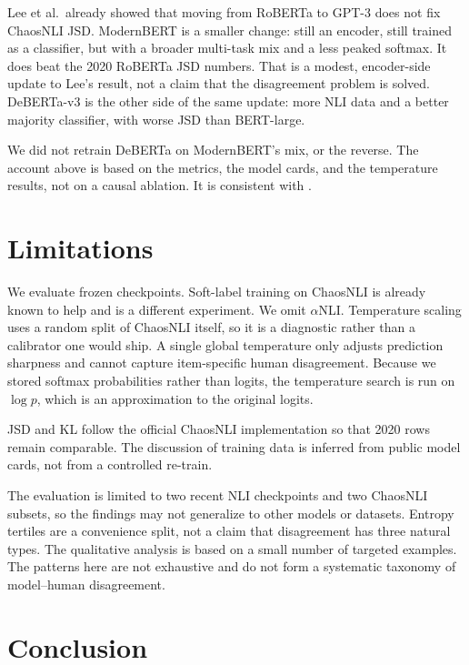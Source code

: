\documentclass[11pt,a4paper]{article}
\begin{document}
Lee et al.\ already showed that moving from RoBERTa to GPT-3 does not fix ChaosNLI JSD. ModernBERT is a smaller change: still an encoder, still trained as a classifier, but with a broader multi-task mix and a less peaked softmax. It does beat the 2020 RoBERTa JSD numbers. That is a modest, encoder-side update to Lee's result, not a claim that the disagreement problem is solved. DeBERTa-v3 is the other side of the same update: more NLI data and a better majority classifier, with worse JSD than BERT-large.

We did not retrain DeBERTa on ModernBERT's mix, or the reverse. The account above is based on the metrics, the model cards, and the temperature results, not on a causal ablation. It is consistent with \cite{nie2020chaosnli,meissner2021capturing,baan2022stop,pavlick2019inherent}.

\section{Limitations}

We evaluate frozen checkpoints. Soft-label training on ChaosNLI is already known to help \cite{zhou2022distributed} and is a different experiment. We omit $\alpha$NLI. Temperature scaling uses a random split of ChaosNLI itself, so it is a diagnostic rather than a calibrator one would ship. A single global temperature only adjusts prediction sharpness and cannot capture item-specific human disagreement. Because we stored softmax probabilities rather than logits, the temperature search is run on $\log p$, which is an approximation to the original logits.

JSD and KL follow the official ChaosNLI implementation so that 2020 rows remain comparable. The discussion of training data is inferred from public model cards, not from a controlled re-train.

The evaluation is limited to two recent NLI checkpoints and two ChaosNLI subsets, so the findings may not generalize to other models or datasets. Entropy tertiles are a convenience split, not a claim that disagreement has three natural types. The qualitative analysis is based on a small number of targeted examples. The patterns here are not exhaustive and do not form a systematic taxonomy of model--human disagreement.

\section{Conclusion}
\end{document}
